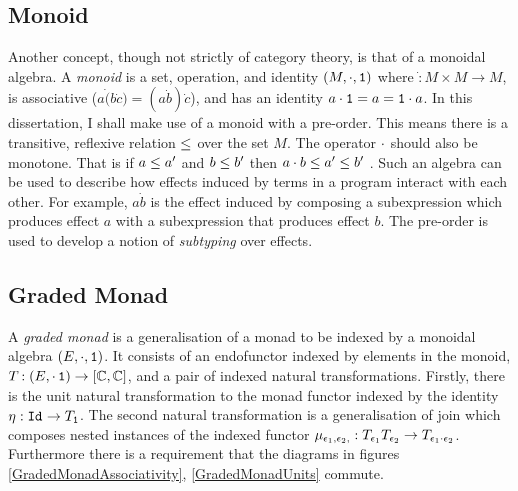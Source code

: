 \documentclass{Report}
\begin{document}
\subsection{Monoid}

Another concept, though not strictly of category theory, is that of a monoidal algebra. A \textit{monoid} is a set, operation, and identity $(M, \dot, \1)$ where $\dot: M\times M \rightarrow M$, is associative ($a\dot(b\dot c) = (a\dot b)\dot c$), and has an identity $a\dot\1 = a = \1\dot a$. In this dissertation, I shall make use of a monoid with a pre-order. This means there is a transitive, reflexive relation $\subeffect$ over the set $M$. The operator $\dot$ should also be monotone. That is if $a \subeffect a'$ and $b\subeffect b'$ then $a\dot b \subeffect a'\subeffect b'$ . Such an algebra can be used to describe how effects induced by terms in a program interact with each other. For example, $a \dot b$ is the effect induced by composing a subexpression which produces effect $a$ with a subexpression that produces effect $b$. The pre-order is used to develop a notion of \textit{subtyping} over effects.

\subsection{Graded Monad}


A \textit{graded monad} is a generalisation of a monad to be indexed by a monoidal algebra $(E,\dot, \1)$. It consists of an endofunctor indexed by elements in the monoid, $\T{}{}: (E, \dot\, \1)  \rightarrow [\C, \C]$, and a pair of indexed natural transformations. Firstly, there is the unit natural transformation to the monad functor indexed by the identity $\point{}: \Id{} \rightarrow \T{\1}{}$. The second natural transformation is a generalisation of join which composes nested instances of the indexed functor $\bind{\e_1}{\e_2}{}: \T{\e_1}{\T{\e_2}{}} \rightarrow \T{\e_1 \dot \e_2}{}$. Furthermore there is a requirement that the diagrams in figures \ref{GradedMonadAssociativity}, \ref{GradedMonadUnits} commute.
\end{document}
